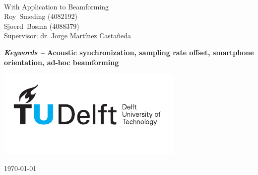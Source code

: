 
\begin{titlepage}
        \begin{center}
		\begin{spacing}{2.5}
			{\Huge\sffamily\textbf{\inserttitle}} \\[0.5cm]
		\end{spacing}
		{\huge\sffamily With Application to Beamforming} \\[1cm]
		{\large
			Roy~Smeding (4082192)\\
			Sjoerd~Bosma (4088379)\\
			Supervisor: dr. Jorge Mart\'inez Casta\~neda
		}

		\vspace{4em}

		\begin{abstract}
		A time-domain (TD) and a frequency-domain (FD) method for time offset (TO) compensation between received audio data are presented and implemented on Android smartphones and a processing computer. Simulations show the TD method is superior in almost all applications. Real-life experiments show the TD synchronization error is below $6$ samples. A Java and \matlab server application and an Android application are presented to acquire audio and orientation data with the intent of applying beamforming algorithms. Orientation data from Android smartphones is shown to be inconsistent among devices and is therefore inadequate for beamforming applications. Sampling rate offset (SRO) on Android smartphones is characterized by analyzing long duration audio recordings from the devices. Future work could include an SRO compensation algorithm, self-localization of the smartphones and distributed synchronization.
		\end{abstract}
		
		{\bfseries \textit{Keywords --} Acoustic synchronization, sampling rate offset, smartphone orientation, ad-hoc beamforming}

		\vfill
		\begin{minipage}{0.45\linewidth}
			\begin{flushleft}
				\includegraphics[width=0.3\paperwidth]{figures/tud-logo.pdf}
			\end{flushleft}
		\end{minipage}
		\begin{minipage}{0.45\linewidth}
			\begin{flushright}
				\vspace{13pt} \Large\today
			\end{flushright}
		\end{minipage}
        \end{center}
\end{titlepage}

